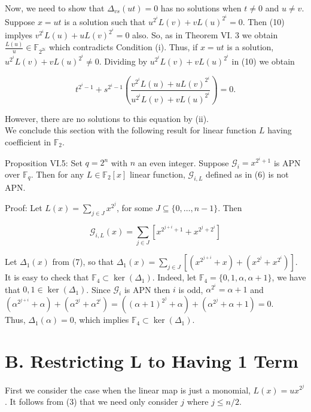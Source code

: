 \documentclass[10pt]{article}
\begin{document}
Now, we need to show that $\Delta_{v s}(u t)=0$ has no solutions when $t \neq 0$ and $u \neq v$. Suppose $x=u t$ is a solution such that $u^{2^{i}} L(v)+v L(u)^{2^{i}}=0$. Then (10) implyes $v^{2^{i}} L(u)+u L(v)^{2^{i}}=0$ also. So, as in Theorem VI. 3 we obtain $\frac{L(u)}{u} \in \mathbb{F}_{2^{2 i}}$ which contradicts Condition (i). Thus, if $x=u t$ is a solution, $u^{2^{i}} L(v)+v L(u)^{2^{i}} \neq 0$. Dividing by $u^{2^{i}} L(v)+v L(u)^{2^{i}}$ in (10) we obtain

$$
t^{2^{i}-1}+s^{2^{i}-1}\left(\frac{v^{2^{i}} L(u)+u L(v)^{2^{i}}}{u^{2^{i}} L(v)+v L(u)^{2^{i}}}\right)=0 .
$$

However, there are no solutions to this equation by (ii).\\
We conclude this section with the following result for linear function $L$ having coefficient in $\mathbb{F}_{2}$.

Proposition VI.5: Set $q=2^{n}$ with $n$ an even integer. Suppose $\mathcal{G}_{i}=x^{2^{i}+1}$ is APN over $\mathbb{F}_{q}$. Then for any $L \in \mathbb{F}_{2}[x]$ linear function, $\mathcal{G}_{i, L}$ defined as in (6) is not APN.

Proof: Let $L(x)=\sum_{j \in J} x^{2^{j}}$, for some $J \subseteq\{0, \ldots, n-1\}$. Then

$$
\mathcal{G}_{i, L}(x)=\sum_{j \in J}\left[x^{2^{j+i}+1}+x^{2^{j}+2^{i}}\right]
$$

Let $\Delta_{1}(x)$ from (7), so that $\Delta_{1}(x)=\sum_{j \in J}\left[\left(x^{2^{j+i}}+x\right)+\right. \left.\left(x^{2^{j}}+x^{2^{i}}\right)\right]$. It is easy to check that $\mathbb{F}_{4} \subset \operatorname{ker}\left(\Delta_{1}\right)$. Indeed, let $\mathbb{F}_{4}=\{0,1, \alpha, \alpha+1\}$, we have that $0,1 \in \operatorname{ker}\left(\Delta_{1}\right)$. Since $\mathcal{G}_{i}$ is APN then $i$ is odd, $\alpha^{2^{i}}=\alpha+1$ and\\
$\left(\alpha^{2^{j+i}}+\alpha\right)+\left(\alpha^{2^{j}}+\alpha^{2^{i}}\right)=\left((\alpha+1)^{2^{j}}+\alpha\right)+\left(\alpha^{2^{j}}+\alpha+1\right)=0$.\\
Thus, $\Delta_{1}(\alpha)=0$, which implies $\mathbb{F}_{4} \subset \operatorname{ker}\left(\Delta_{1}\right)$.

\section*{B. Restricting L to Having 1 Term}
First we consider the case when the linear map is just a monomial, $L(x)=u x^{2^{j}}$. It follows from (3) that we need only consider $j$ where $j \leq n / 2$.
\end{document}
